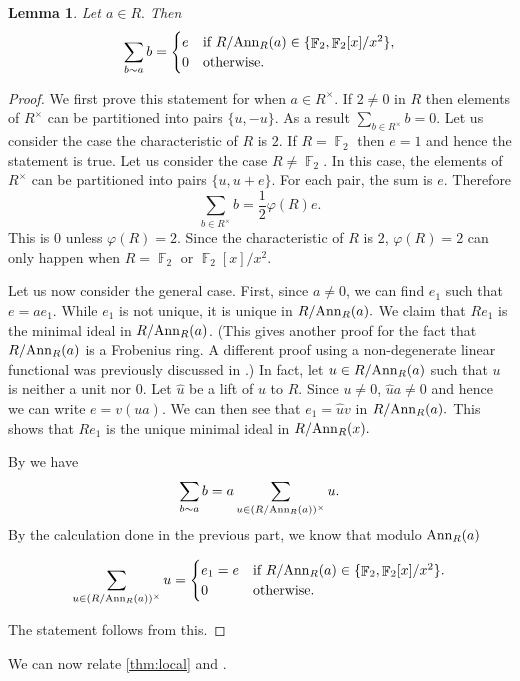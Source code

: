 \documentclass[12pt, a4paper]{amsart}
\newtheorem{lem}[thm]{Lemma}
\theoremstyle{definition}
\DeclareMathOperator{\F}{\mathbb{F}}
\newcommand{\Ann}{{\rm Ann}}
\numberwithin{equation}{section}
\begin{document}
\begin{lem}  \label{lem:sum_elements}
Let $a \in R.$ Then 
  \[
\sum_{b \sim a } b =
\begin{cases}
e & \text{if } R/\Ann_{R}(a) \in \{\F_2, \F_2[x]/x^2\}, \\
0 & \text{otherwise. } 
\end{cases}
\]
\end{lem} 
\begin{proof}
    We first prove this statement for when $a \in R^{\times}.$ If $2 \neq 0 $ in $R$ then elements of $R^{\times}$ can be partitioned into pairs $\{u, -u\}$. As a result $\sum_{b \in R^{\times}} b =0.$ Let us consider the case the characteristic of $R$ is $2.$ If $R=\F_2$ then  $e=1$ and hence the statement is true. Let us consider the case $R \neq \F_2$. In this case, the elements of $R^{\times}$ can be partitioned into pairs $\{u, u+e\}.$ For each pair, the sum is $e$. Therefore 
    \[ \sum_{b \in R^{\times}} b = \frac{1}{2} \varphi(R) e. \]
    This is $0$ unless $\varphi(R)=2.$ Since the characteristic of $R$ is $2$, $\varphi(R)=2$ can only happen when $R=\F_2$ or $\F_2[x]/x^2.$


    Let us now consider the general case. First,  since $a \neq 0$, we can find $e_1$ such that $e = a e_1.$ While $e_1$ is not unique, it is unique in $R/\Ann_{R}(a).$ We claim that $Re_1$ is the minimal ideal in $R/\Ann_{R}(a)$. (This gives another proof for the fact that $R/\Ann_{R}(a)$ is a Frobenius ring. A different proof using a non-degenerate linear functional was previously discussed in \cite[Lemma 4.3]{nguyen2025gcd}.) In fact, let $u \in R/\Ann_{R}(a)$ such that $u$ is neither a unit nor $0$. Let $\hat{u}$ be a lift of $u$ to $R.$ Since $u \neq 0$, $\hat{u}a \neq 0$ and hence we can write $e= v(ua).$ We can then see that $e_1 = \hat{u}v $ in $R/\Ann_{R}(a).$ This shows that $Re_1$ is the unique minimal ideal in $R/\Ann_{R}(x).$


    By \cite[Corollary 2.7]{nguyen2025gcd} we have 
    \[ \sum_{b \sim a} b = a \sum_{u \in (R/\Ann_{R}(a))^{\times}} u. \]
    By the calculation done in the previous part, we know that modulo $\Ann_{R}(a)$

  \[
\sum_{u \in (R/\Ann_{R}(a))^{\times}} u=
\begin{cases}
e_1 =e& \text{if } R/\Ann_{R}(a) \in \{\F_2, \F_2[x]/x^2\}. \\
0 & \text{otherwise. } 
\end{cases}
\]

The statement follows  from this.     
\end{proof}
We can now relate \cref{thm:local} and \cite[Theorem 2.3]{cheung2011perfect}.
\end{document}
